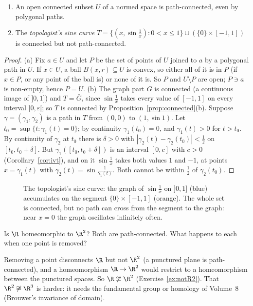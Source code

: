 \begin{proposition}\label{prop:openconnected}
\begin{enumerate}[label=(\alph*)]
\item An open connected subset $U$ of a normed space is path-connected, even by polygonal paths.
\item The \emph{topologist's sine curve} $T=\{(x,\sin\frac1x):0<x\le1\}\cup(\{0\}\times[-1,1])$ is connected but not path-connected.
\end{enumerate}
\end{proposition}
\begin{proof}
(a) Fix $a\in U$ and let $P$ be the set of points of $U$ joined to $a$ by a polygonal path in $U$. If $x\in U$, a ball $B(x,r)\subseteq U$ is convex, so either
all of it is in $P$ (if $x\in P$, or any point of the ball is) or none of it is. So $P$ and $U\setminus P$ are open; $P\ni a$ is non-empty, hence $P=U$.
(b) The graph part $G$ is connected (a continuous image of $]0,1]$) and $T=\bar G$, since $\sin\frac1x$ takes every value of $[-1,1]$ on every interval
$]0,\varepsilon[$; so $T$ is connected by Proposition~\ref{prop:connected}(b). Suppose $\gamma=(\gamma_1,\gamma_2)$ is a path in $T$ from $(0,0)$ to $(1,\sin1)$. Let
$t_0=\sup\{t:\gamma_1(t)=0\}$; by continuity $\gamma_1(t_0)=0$, and $\gamma_1(t)>0$ for $t>t_0$. By continuity of $\gamma_2$ at $t_0$ there is $\delta>0$ with
$|\gamma_2(t)-\gamma_2(t_0)|<\frac12$ on $[t_0,t_0+\delta]$. But $\gamma_1([t_0,t_0+\delta])$ is an interval $[0,c]$ with $c>0$ (Corollary~\ref{cor:ivt}), and on it $\sin\frac1x$ takes
both values $1$ and $-1$, at points $x=\gamma_1(t)$ with $\gamma_2(t)=\sin\frac1{\gamma_1(t)}$. Both cannot be within $\frac12$ of $\gamma_2(t_0)$.
\end{proof}

\begin{figure}[ht]
\centering
{}
\caption{The topologist's sine curve: the graph of $\sin\frac1x$ on $]0,1]$ (blue) accumulates on the segment $\{0\}\times[-1,1]$ (orange). The whole set is
connected, but no path can cross from the segment to the graph: near $x=0$ the graph oscillates infinitely often.}
\label{fig:sine}
\end{figure}

\begin{think}
Is $\R$ homeomorphic to $\R^2$? Both are path-connected. What happens to each when one point is removed?
\end{think}

Removing a point disconnects $\R$ but not $\R^2$ (a punctured plane is path-connected), and a homeomorphism $\R\to\R^2$ would restrict to a
homeomorphism between the punctured spaces. So $\R\not\cong\R^2$ (Exercise~\ref{ex:notR2}). That $\R^2\not\cong\R^3$ is harder: it needs the fundamental
group or homology of Volume~8 (Brouwer's invariance of domain).


